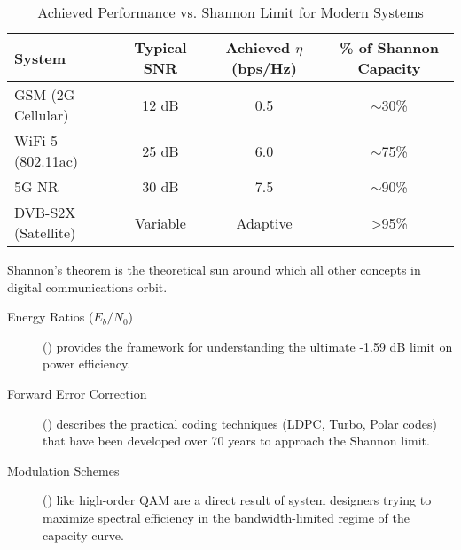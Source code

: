 \begin{table}[H]
    \centering
    \caption{Achieved Performance vs. Shannon Limit for Modern Systems}
    \label{tab:shannon-gap}
    \begin{tabular}{@{}lccc@{}}
        \toprule
        \tableheaderfont System & \tableheaderfont Typical SNR & \tableheaderfont Achieved $\eta$ (bps/Hz) & \tableheaderfont \% of Shannon Capacity \\
        \midrule
        GSM (2G Cellular) & 12 dB & 0.5 & $\sim$30\% \\
        WiFi 5 (802.11ac) & 25 dB & 6.0 & $\sim$75\% \\
        5G NR & 30 dB & 7.5 & $\sim$90\% \\
        DVB-S2X (Satellite) & Variable & Adaptive & >95\% \\
        \bottomrule
    \end{tabular}
\end{table}


\begin{importantbox}[title={Further Reading}]
    Shannon's theorem is the theoretical sun around which all other concepts in digital communications orbit.
    \begin{description}
        \item[Energy Ratios ($E_b/N_0$)] () provides the framework for understanding the ultimate -1.59 dB limit on power efficiency.
        \item[Forward Error Correction] () describes the practical coding techniques (LDPC, Turbo, Polar codes) that have been developed over 70 years to approach the Shannon limit.
        \item[Modulation Schemes] () like high-order QAM are a direct result of system designers trying to maximize spectral efficiency in the bandwidth-limited regime of the capacity curve.
    \end{description}
\end{importantbox}